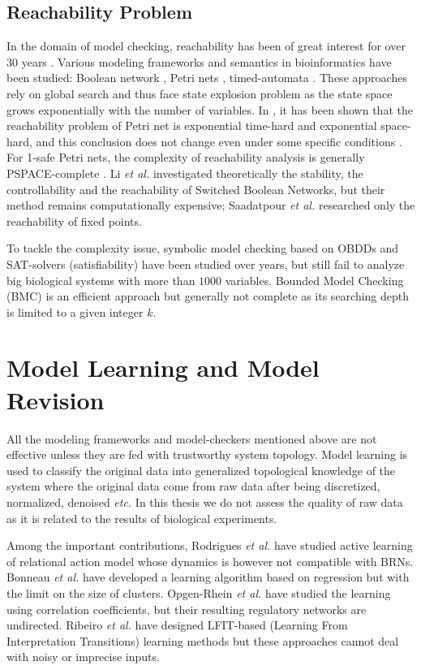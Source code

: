 \subsection{Reachability Problem}
In the domain of model checking, reachability has been of great interest for over 30 years \cite{clarke2008birth,clarke20142}. 
Various modeling frameworks and semantics in bioinformatics have been studied: Boolean network \cite{akutsu2007control}, Petri nets \cite{mayr1984,esparza1998}, timed-automata \cite{Daws1998,wozna2003}. 
These approaches rely on global search and thus face state explosion problem as the state space grows exponentially with the number of variables. 
In \cite{peterson1977petri}, it has been shown that the reachability problem of Petri net is exponential time-hard and exponential space-hard, and this conclusion does not change even under some specific conditions \cite{esparza1998}. 
For 1-safe Petri nets, the complexity of reachability analysis is generally PSPACE-complete \cite{cheng1995complexity}.
Li \textit{et al.} \cite{li2012reachability,li2014stability} investigated theoretically the stability, the controllability and the reachability of Switched Boolean Networks, but their method remains computationally expensive;
Saadatpour \textit{et al.} \cite{saadatpour2010attractor} researched only the reachability of fixed points.

To tackle the complexity issue, symbolic model checking \cite{burch1992symbolic} based on OBDDs and SAT-solvers (satisfiability) \cite{abdulla2000symbolic} have been studied over years, but still fail to analyze big biological systems with more than $1000$ variables. 
Bounded Model Checking (BMC) \cite{clarke2001bounded} is an efficient approach but generally not complete as its searching depth is limited to a given integer $k$.

\section{Model Learning and Model Revision}
All the modeling frameworks and model-checkers mentioned above are not effective unless they are fed with trustworthy system topology.
Model learning is used to classify the original data into generalized topological knowledge of the system where the original data come from raw data after being discretized, normalized, denoised \textit{etc.}
In this thesis we do not assess the quality of raw data as it is related to the results of biological experiments.

Among the important contributions, Rodrigues \textit{et al.} \cite{rodrigues2011active} have studied active learning of relational action model whose dynamics is however not compatible with BRNs.
Bonneau \textit{et al.} \cite{bonneau2006inferelator} have developed a learning algorithm based on regression but with the limit on the size of clusters.
Opgen-Rhein \textit{et al.} \cite{opgen2007correlation} have studied the learning using correlation coefficients, but their resulting regulatory networks are undirected. 
Ribeiro \textit{et al.} have designed LFIT-based (Learning From Interpretation Transitions) learning methods \cite{ribeiro2015learning,ribeiro2018learning,ribeiro2017inductive} but these approaches cannot deal with noisy or imprecise inputs.


